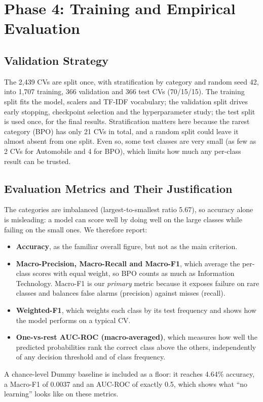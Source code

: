 \documentclass[11pt,a4paper]{article}
\begin{document}
\FloatBarrier

\section{Phase 4: Training and Empirical Evaluation}

\subsection{Validation Strategy}
The 2{,}439 CVs are split once, with stratification by category and random
seed 42, into 1{,}707 training, 366 validation and 366 test CVs (70/15/15).
The training split fits the model, scalers and TF-IDF vocabulary; the
validation split drives early stopping, checkpoint selection and the
hyperparameter study; the test split is used once, for the final results.
Stratification matters here because the rarest category (BPO) has only 21 CVs
in total, and a random split could leave it almost absent from one split.
Even so, some test classes are very small (as few as 2 CVs for Automobile and
4 for BPO), which limits how much any per-class result can be trusted.

\subsection{Evaluation Metrics and Their Justification}
The categories are imbalanced (largest-to-smallest ratio 5.67), so accuracy
alone is misleading: a model can score well by doing well on the large
classes while failing on the small ones. We therefore report:
\begin{itemize}
  \item \textbf{Accuracy}, as the familiar overall figure, but not as the
  main criterion.
  \item \textbf{Macro-Precision, Macro-Recall and Macro-F1}, which average the
  per-class scores with equal weight, so BPO counts as much as Information
  Technology. Macro-F1 is our \emph{primary} metric because it exposes failure
  on rare classes and balances false alarms (precision) against misses
  (recall).
  \item \textbf{Weighted-F1}, which weights each class by its test frequency
  and shows how the model performs on a typical CV.
  \item \textbf{One-vs-rest AUC-ROC (macro-averaged)}, which measures how well
  the predicted probabilities rank the correct class above the others,
  independently of any decision threshold and of class frequency.
\end{itemize}
A chance-level Dummy baseline is included as a floor: it reaches 4.64\%
accuracy, a Macro-F1 of 0.0037 and an AUC-ROC of exactly 0.5, which shows what
``no learning'' looks like on these metrics.
\end{document}
